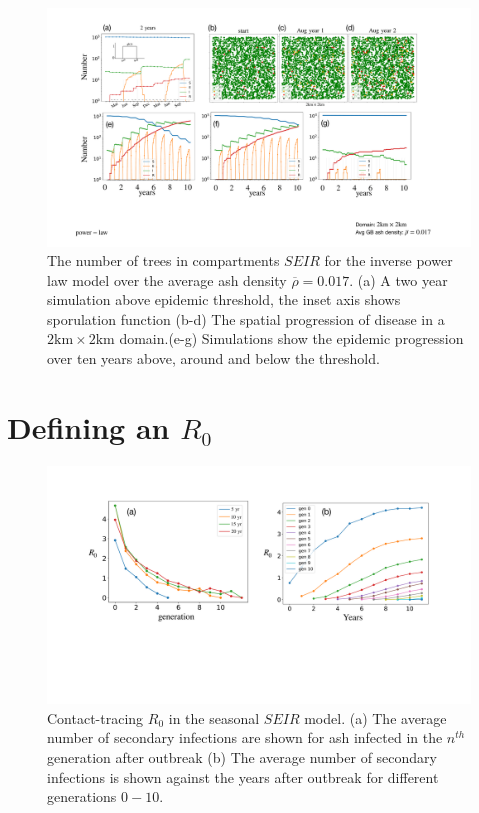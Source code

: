 \begin{landscape}
\begin{figure}
    \centering
    \includegraphics[scale=0.45]{chapter6/figures/fig4-seir.pdf}
    \caption{The number of trees in compartments $SEIR$ for the inverse power law model over the average ash density $\overline{\rho} = 0.017$. (a) A two year simulation above epidemic threshold, the inset axis shows sporulation function (b-d) The spatial progression of disease in a $2\mathrm{km} \times 2\mathrm{km}$ domain.(e-g) Simulations show the epidemic progression over ten years above, around and below the threshold.}
    \label{fig:SEIR-spread}
\end{figure}
\end{landscape}


\section{Defining an $R_0$}

\begin{figure}
    \centering
    \includegraphics[scale=0.3]{chapter6/figures/fig5-R0-def.pdf}
    \caption{Contact-tracing $R_0$ in the seasonal $SEIR$ model. (a) The average number of secondary infections are shown for ash infected in the $n^{th}$ generation after outbreak (b) The average number of secondary infections is shown against the years after outbreak for different generations $0-10$.}
    \label{fig:SEIR-R0-definition}
\end{figure}


